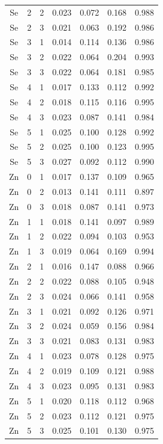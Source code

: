 \documentclass[ms, hidelinks]{uncgdissertationexp3}
\theoremstyle{plain}
\theoremstyle{definition}
\theoremstyle{remark}
\begin{document}
\begin{longtable}{ccccccc}
  Se & 2 & 2 & 0.023 & 0.072 & 0.168 & 0.988\\
  \rowcolor{gray!6}  Se & 2 & 3 & 0.021 & 0.063 & 0.192 & 0.986\\
  Se & 3 & 1 & 0.014 & 0.114 & 0.136 & 0.986\\
  \rowcolor{gray!6}  Se & 3 & 2 & 0.022 & 0.064 & 0.204 & 0.993\\
  Se & 3 & 3 & 0.022 & 0.064 & 0.181 & 0.985\\
  \rowcolor{gray!6}  Se & 4 & 1 & 0.017 & 0.133 & 0.112 & 0.992\\
  Se & 4 & 2 & 0.018 & 0.115 & 0.116 & 0.995\\
  \rowcolor{gray!6}  Se & 4 & 3 & 0.023 & 0.087 & 0.141 & 0.984\\
  Se & 5 & 1 & 0.025 & 0.100 & 0.128 & 0.992\\
  \rowcolor{gray!6}  Se & 5 & 2 & 0.025 & 0.100 & 0.123 & 0.995\\
  Se & 5 & 3 & 0.027 & 0.092 & 0.112 & 0.990\\
  \rowcolor{gray!6}  Zn & 0 & 1 & 0.017 & 0.137 & 0.109 & 0.965\\
  Zn & 0 & 2 & 0.013 & 0.141 & 0.111 & 0.897\\
  \rowcolor{gray!6}  Zn & 0 & 3 & 0.018 & 0.087 & 0.141 & 0.973\\
  Zn & 1 & 1 & 0.018 & 0.141 & 0.097 & 0.989\\
  \rowcolor{gray!6}  Zn & 1 & 2 & 0.022 & 0.094 & 0.103 & 0.953\\
  Zn & 1 & 3 & 0.019 & 0.064 & 0.169 & 0.994\\
  \rowcolor{gray!6}  Zn & 2 & 1 & 0.016 & 0.147 & 0.088 & 0.966\\
  Zn & 2 & 2 & 0.022 & 0.088 & 0.105 & 0.948\\
  \rowcolor{gray!6}  Zn & 2 & 3 & 0.024 & 0.066 & 0.141 & 0.958\\
  Zn & 3 & 1 & 0.021 & 0.092 & 0.126 & 0.971\\
  \rowcolor{gray!6}  Zn & 3 & 2 & 0.024 & 0.059 & 0.156 & 0.984\\
  Zn & 3 & 3 & 0.021 & 0.083 & 0.131 & 0.983\\
  \rowcolor{gray!6}  Zn & 4 & 1 & 0.023 & 0.078 & 0.128 & 0.975\\
  Zn & 4 & 2 & 0.019 & 0.109 & 0.121 & 0.988\\
  \rowcolor{gray!6}  Zn & 4 & 3 & 0.023 & 0.095 & 0.131 & 0.983\\
  Zn & 5 & 1 & 0.020 & 0.118 & 0.112 & 0.968\\
  \rowcolor{gray!6}  Zn & 5 & 2 & 0.023 & 0.112 & 0.121 & 0.975\\
  Zn & 5 & 3 & 0.025 & 0.101 & 0.130 & 0.975\\*
  \end{longtable}
\end{document}
